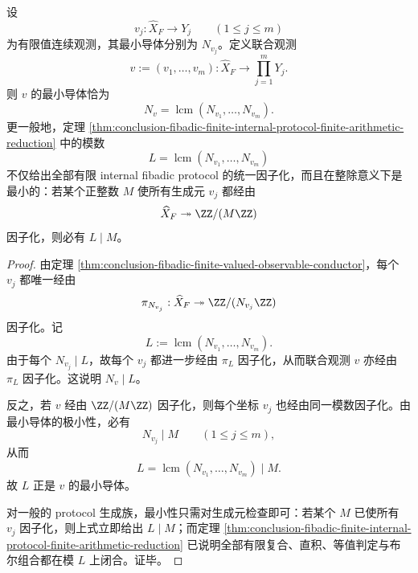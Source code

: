 \begin{corollary}[有限观测族的最小联合导体]\label{cor:conclusion-fibadic-joint-observable-minimal-conductor}
设
\[
v_j:\widehat X_F\to Y_j
\qquad
(1\le j\le m)
\]
为有限值连续观测，其最小导体分别为 \(N_{v_j}\)。定义联合观测
\[
v:=(v_1,\dots,v_m):\widehat X_F\to \prod_{j=1}^{m}Y_j.
\]
则 \(v\) 的最小导体恰为
\[
N_v=\operatorname{lcm}(N_{v_1},\dots,N_{v_m}).
\]
更一般地，定理 \ref{thm:conclusion-fibadic-finite-internal-protocol-finite-arithmetic-reduction} 中的模数
\[
L=\operatorname{lcm}(N_{v_1},\dots,N_{v_m})
\]
不仅给出全部有限 internal fibadic protocol 的统一因子化，而且在整除意义下是最小的：若某个正整数 \(M\) 使所有生成元 \(v_j\) 都经由
\[
\widehat X_F\twoheadrightarrow \ZZ/(M\ZZ)
\]
因子化，则必有 \(L\mid M\)。
\end{corollary}
\begin{proof}
由定理 \ref{thm:conclusion-fibadic-finite-valued-observable-conductor}，每个 \(v_j\) 都唯一经由
\[
\pi_{N_{v_j}}:\widehat X_F\twoheadrightarrow \ZZ/(N_{v_j}\ZZ)
\]
因子化。记
\[
L:=\operatorname{lcm}(N_{v_1},\dots,N_{v_m}).
\]
由于每个 \(N_{v_j}\mid L\)，故每个 \(v_j\) 都进一步经由 \(\pi_L\) 因子化，从而联合观测 \(v\) 亦经由 \(\pi_L\) 因子化。这说明 \(N_v\mid L\)。

反之，若 \(v\) 经由 \(\ZZ/(M\ZZ)\) 因子化，则每个坐标 \(v_j\) 也经由同一模数因子化。由最小导体的极小性，必有
\[
N_{v_j}\mid M
\qquad
(1\le j\le m),
\]
从而
\[
L=\operatorname{lcm}(N_{v_1},\dots,N_{v_m})\mid M.
\]
故 \(L\) 正是 \(v\) 的最小导体。

对一般的 protocol 生成族，最小性只需对生成元检查即可：若某个 \(M\) 已使所有 \(v_j\) 因子化，则上式立即给出 \(L\mid M\)；而定理 \ref{thm:conclusion-fibadic-finite-internal-protocol-finite-arithmetic-reduction} 已说明全部有限复合、直积、等值判定与布尔组合都在模 \(L\) 上闭合。证毕。
\end{proof}

